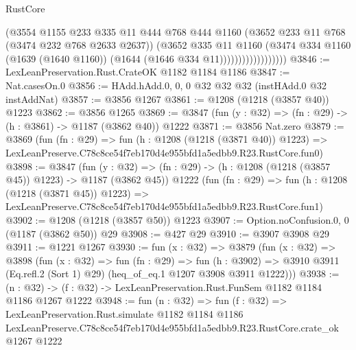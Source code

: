\begin{lexlean}{RustCore}
\begin{coremodule}
                              (@3554
                                @1155
                                @233
                                @335
                                @11
                                @444
                                @768
                                @444
                                @1160
                                (@3652 @233 @11 @768 (@3474 @232 @768 @2633 @2637))
                                (@3652
                                  @335
                                  @11
                                  @1160
                                  (@3474
                                    @334
                                    @1160
                                    (@1639 (@1640 @1160))
                                    (@1644 (@1646 @334 @11))))))))))))))))))
@3846 := LexLeanPreservation.Rust.CrateOK @1182 @1184 @1186
@3847 := Nat.casesOn.{0}
@3856 := HAdd.hAdd.{0, 0, 0} @32 @32 @32 (instHAdd.{0} @32 instAddNat)
@3857 := @3856 @1267
@3861 := @1208 (@1218 (@3857 @40)) @1223
@3862 := @3856 @1265
@3869 := @3847 (fun (y : @32) => (fn : @29) -> (h : @3861) -> @1187 (@3862 @40)) @1222
@3871 := @3856 Nat.zero
@3879 := @3869
    (fun (fn : @29) =>
    fun (h : @1208 (@1218 (@3871 @40)) @1223) =>
    LexLeanPreserve.C78c8ce54f7eb170d4e955bfd1a5edbb9.R23.RustCore.fun0)
@3898 := @3847
    (fun (y : @32) => (fn : @29) -> (h : @1208 (@1218 (@3857 @45)) @1223) -> @1187 (@3862 @45))
    @1222
    (fun (fn : @29) =>
    fun (h : @1208 (@1218 (@3871 @45)) @1223) =>
    LexLeanPreserve.C78c8ce54f7eb170d4e955bfd1a5edbb9.R23.RustCore.fun1)
@3902 := @1208 (@1218 (@3857 @50)) @1223
@3907 := Option.noConfusion.{0, 0} (@1187 (@3862 @50)) @29
@3908 := @427 @29
@3910 := @3907 @3908 @29
@3911 := @1221 @1267
@3930 := fun (x : @32) =>
  @3879
    (fun (x : @32) =>
    @3898
      (fun (x : @32) =>
      fun (fn : @29) =>
      fun (h : @3902) =>
      @3910 @3911 (Eq.refl.{2} (Sort 1) @29) (heq_of_eq.{1} @1207 @3908 @3911 @1222)))
@3938 := (n : @32) -> (f : @32) -> LexLeanPreservation.Rust.FunSem @1182 @1184 @1186 @1267 @1222
@3948 := fun (n : @32) =>
  fun (f : @32) =>
  LexLeanPreservation.Rust.simulate
    @1182
    @1184
    @1186
    LexLeanPreserve.C78c8ce54f7eb170d4e955bfd1a5edbb9.R23.RustCore.crate_ok
    @1267
    @1222
\end{coremodule}
\end{lexlean}
